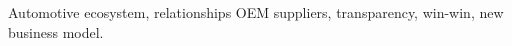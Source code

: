 \documentclass[10pt,conference]{IEEEtran}
\begin{document}
\begin{IEEEkeywords}
Automotive ecosystem, relationships OEM suppliers, transparency, win-win, new business model.

\end{IEEEkeywords}

\IEEEpeerreviewmaketitle









			

\balance



\end{document}
